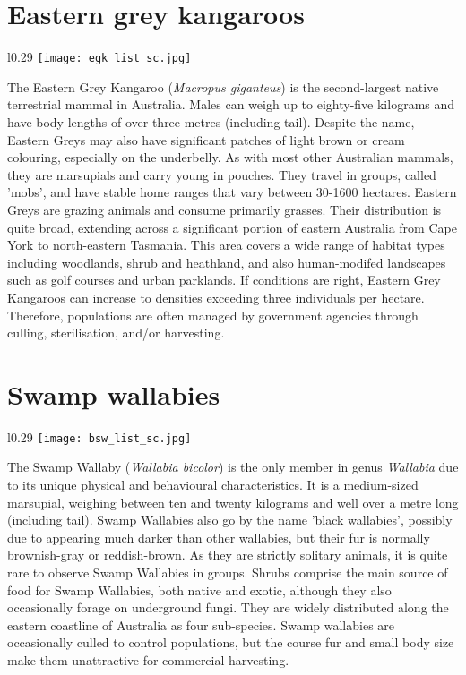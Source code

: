 \section{Eastern grey kangaroos}\label{egk}
\vspace{-0.3cm}
\setlength\intextsep{0pt}
\begin{wrapfigure}[5]{l}{0.29\textwidth}
\centering
\texttt{[image: egk\_list\_sc.jpg]}
\end{wrapfigure}
The Eastern Grey Kangaroo (\textit{Macropus giganteus}) is the second-largest native terrestrial mammal in Australia. Males can weigh up to eighty-five kilograms and have body lengths of over three metres (including tail). Despite the name, Eastern Greys may also have significant patches of light brown or cream colouring, especially on the underbelly. As with most other Australian mammals, they are marsupials and carry young in pouches. They travel in groups, called 'mobs', and have stable home ranges that vary between 30-1600 hectares. Eastern Greys are grazing animals and consume primarily grasses. Their distribution is quite broad, extending across a significant portion of eastern Australia from Cape York to north-eastern Tasmania. This area covers a wide range of habitat types including woodlands, shrub and heathland, and also human-modifed landscapes such as golf courses and urban parklands. If conditions are right, Eastern Grey Kangaroos can increase to densities exceeding three individuals per hectare. Therefore, populations are often managed by government agencies through culling, sterilisation, and/or harvesting.

\section{Swamp wallabies}\label{bsw}
\vspace{-0.3cm}
\setlength\intextsep{0pt}
\begin{wrapfigure}{l}{0.29\textwidth}
\centering
\texttt{[image: bsw\_list\_sc.jpg]}
\end{wrapfigure}
The Swamp Wallaby (\textit{Wallabia bicolor}) is the only member in genus \textit{Wallabia} due to its unique physical and behavioural characteristics. It is a medium-sized marsupial, weighing between ten and twenty kilograms and well over a metre long (including tail). Swamp Wallabies also go by the name 'black wallabies', possibly due to appearing much darker than other wallabies, but their fur is normally brownish-gray or reddish-brown. As they are strictly solitary animals, it is quite rare to observe Swamp Wallabies in groups. Shrubs comprise the main source of food for Swamp Wallabies, both native and exotic, although they also occasionally forage on underground fungi. They are widely distributed along the eastern coastline of Australia as four sub-species. Swamp wallabies are occasionally culled to control populations, but the course fur and small body size make them unattractive for commercial harvesting.

